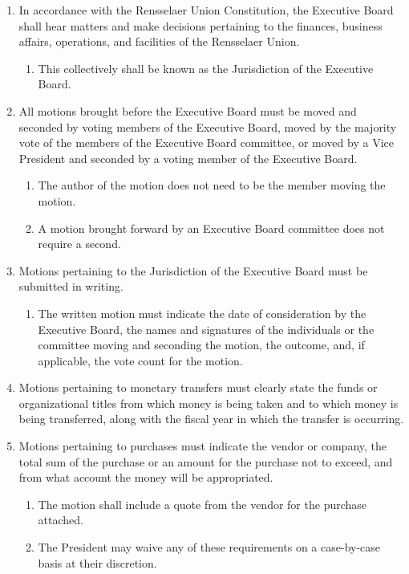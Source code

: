 \begin{enumerate}
\item In accordance with the Rensselaer Union Constitution, the Executive Board shall hear matters and make decisions pertaining to the finances, business affairs, operations, and facilities of the Rensselaer Union.
  \begin{enumerate}
  \item This collectively shall be known as the Jurisdiction of the Executive Board.
  \end{enumerate}
\item All motions brought before the Executive Board must be moved and seconded by voting members of the Executive Board, moved by the majority vote of the members of the Executive Board committee, or moved by a Vice President and seconded by a voting member of the Executive Board.
  \begin{enumerate}
  \item The author of the motion does not need to be the member moving the motion.
  \item A motion brought forward by an Executive Board committee does not require a second.
  \end{enumerate}
\item Motions pertaining to the Jurisdiction of the Executive Board must be submitted in writing.
  \begin{enumerate}
  \item The written motion must indicate the date of consideration by the Executive Board, the names and signatures of the individuals or the committee moving and seconding the motion, the outcome, and, if applicable, the vote count for the motion.
  \end{enumerate}
\item Motions pertaining to monetary transfers must clearly state the funds or organizational titles from which money is being taken and to which money is being transferred, along with the fiscal year in which the transfer is occurring.
\item Motions pertaining to purchases must indicate the vendor or company, the total sum of the purchase or an amount for the purchase not to exceed, and from what account the money will be appropriated.
  \begin{enumerate}
  \item The motion shall include a quote from the vendor for the purchase attached.
  \item The President may waive any of these requirements on a case-by-case basis at their discretion.

\end{enumerate}
\end{enumerate}
